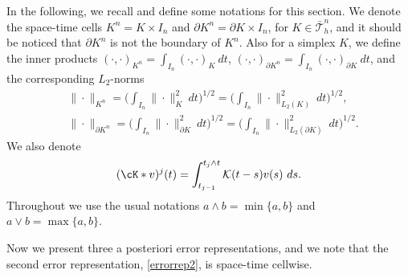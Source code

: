 \documentclass{amsart}
\numberwithin{equation}{section}
\theoremstyle{definition}
\begin{document}
In the following, we recall and define some notations for this section. 
We denote the space-time cells $K^n=K\times I_n$ 
and $\partial K^n=\partial K\times I_n$, for $K \in \bar{\mathcal T}_h^n$, 
and it should be noticed that $\partial K^n$ is not the boundary 
of $K^n$. 
Also for a simplex $K$, we define the inner products 
$(\cdot,\cdot)_{K^n}=\int_{I_n}(\cdot,\cdot)_{K}\  dt$,  
$(\cdot,\cdot)_{\partial K^n}=\int_{I_n}(\cdot,\cdot)_{\partial K}\  dt$,
and the corresponding $L_2$-norms 
\begin{equation*}
  \begin{split}
    &\| \cdot\|_{K^n}=\Big( \int_{I_n} \|\cdot\|_{K}^2\  dt \Big)^{1/2}
      =\Big( \int_{I_n} \|\cdot\|_{L_2(K)}^2\  dt \Big)^{1/2}, \\
    &\| \cdot\|_{\partial K^n}
      =\Big( \int_{I_n} \|\cdot\|_{\partial K}^2\  dt \Big)^{1/2}
      =\Big( \int_{I_n} \|\cdot\|_{L_2(\partial K)}^2\  dt \Big)^{1/2}.
  \end{split}
\end{equation*}
We also denote
\begin{equation}   \label{convolution}
  (\cK*v)^j(t)=\int_{t_{j-1}}^{t_j\wedge t}{\mathcal K}(t-s)v(s)\ ds. 
\end{equation}
Throughout we use the usual notations 
$a\wedge b = \min\{a,b\}$ and $a\vee b =\max\{a,b\}$. 

Now we present three a posteriori error representations, 
and we note that the second error representation, \eqref{errorrep2}, 
is space-time cellwise.  
\end{document}
